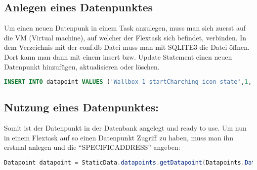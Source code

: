 \subsection{Anlegen eines Datenpunktes}


Um einen neuen Datenpunk in einem Task anzulegen, muss man sich zuerst auf die VM (Virtual machine),  auf welcher der Flextask sich befindet, verbinden. In dem Verzeichnis mit der conf.db Datei muss man mit SQLITE3 die Datei öffnen. Dort kann man dann mit einem insert bzw. Update Statement einen neuen Datenpunkt hinzufügen, aktualisieren oder löschen.  

\begin{lstlisting}[language=sql,caption=Example Element,label=lst:impl:foo]
    INSERT INTO datapoint VALUES ('Wallbox_1_startCharching_icon_state',1,'','state_[Wallbox_1_startCharching_icon]','','','INT',-1,-1,0.0,'');
\end{lstlisting}

\subsection{Nutzung eines Datenpunktes:}

Somit ist der Datenpunkt in der Datenbank angelegt und ready to use. Um nun in einem Flextask auf so einen Datenpunkt Zugriff zu haben, muss man ihn erstmal anlegen und die “SPECIFICADDRESS” angeben: 

\begin{lstlisting}[language=java,caption=Example Datapoint,label=lst:impl:foo]
    Datapoint datapoint = StaticData.datapoints.getDatapoint(Datapoints.DatapointField.SPECIFIC_ADDRESS, “SPECIFIC_ADDRESS_DES_DATENPUNKTES”); 
\end{lstlisting}

